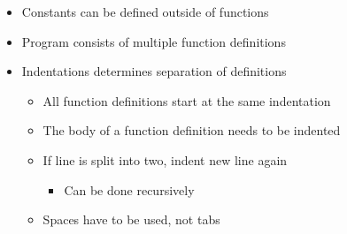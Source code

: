 \begin{itemize}
\begin{itemize}
        \end{itemize}
    \item Constants can be defined outside of functions
    \item Program consists of multiple function definitions
    \item Indentations determines separation of definitions
        \begin{itemize}
            \item All function definitions start at the same indentation
            \item The body of a function definition needs to be indented
            \item If line is split into two, indent new line again
                \begin{itemize}
                    \item Can be done recursively
                \end{itemize}
            \item Spaces have to be used, not tabs
        \end{itemize}
\end{itemize}

